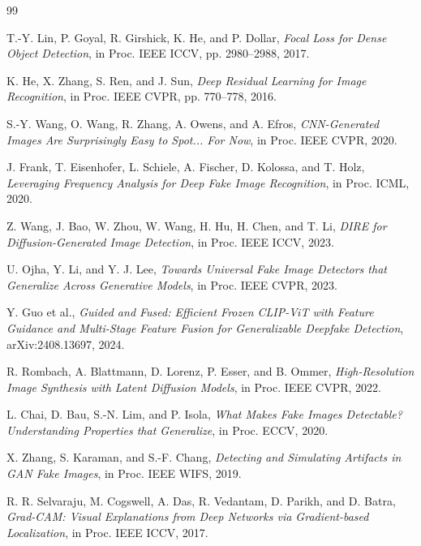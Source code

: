 \documentclass[10pt,twocolumn]{article}
\begin{document}

\begin{thebibliography}{99}

T.-Y. Lin, P. Goyal, R. Girshick, K. He, and P. Dollar,
\textit{Focal Loss for Dense Object Detection},
in Proc. IEEE ICCV, pp. 2980--2988, 2017.

K. He, X. Zhang, S. Ren, and J. Sun,
\textit{Deep Residual Learning for Image Recognition},
in Proc. IEEE CVPR, pp. 770--778, 2016.

S.-Y. Wang, O. Wang, R. Zhang, A. Owens, and A. Efros,
\textit{CNN-Generated Images Are Surprisingly Easy to Spot... For Now},
in Proc. IEEE CVPR, 2020.

J. Frank, T. Eisenhofer, L. Schiele, A. Fischer, D. Kolossa, and T. Holz,
\textit{Leveraging Frequency Analysis for Deep Fake Image Recognition},
in Proc. ICML, 2020.

Z. Wang, J. Bao, W. Zhou, W. Wang, H. Hu, H. Chen, and T. Li,
\textit{DIRE for Diffusion-Generated Image Detection},
in Proc. IEEE ICCV, 2023.

U. Ojha, Y. Li, and Y. J. Lee,
\textit{Towards Universal Fake Image Detectors that Generalize Across Generative Models},
in Proc. IEEE CVPR, 2023.

Y. Guo et al.,
\textit{Guided and Fused: Efficient Frozen CLIP-ViT with Feature Guidance and
Multi-Stage Feature Fusion for Generalizable Deepfake Detection},
arXiv:2408.13697, 2024.

R. Rombach, A. Blattmann, D. Lorenz, P. Esser, and B. Ommer,
\textit{High-Resolution Image Synthesis with Latent Diffusion Models},
in Proc. IEEE CVPR, 2022.

L. Chai, D. Bau, S.-N. Lim, and P. Isola,
\textit{What Makes Fake Images Detectable? Understanding Properties that Generalize},
in Proc. ECCV, 2020.

X. Zhang, S. Karaman, and S.-F. Chang,
\textit{Detecting and Simulating Artifacts in GAN Fake Images},
in Proc. IEEE WIFS, 2019.

R. R. Selvaraju, M. Cogswell, A. Das, R. Vedantam, D. Parikh, and D. Batra,
\textit{Grad-CAM: Visual Explanations from Deep Networks via Gradient-based Localization},
in Proc. IEEE ICCV, 2017.

\end{thebibliography}
\end{document}
